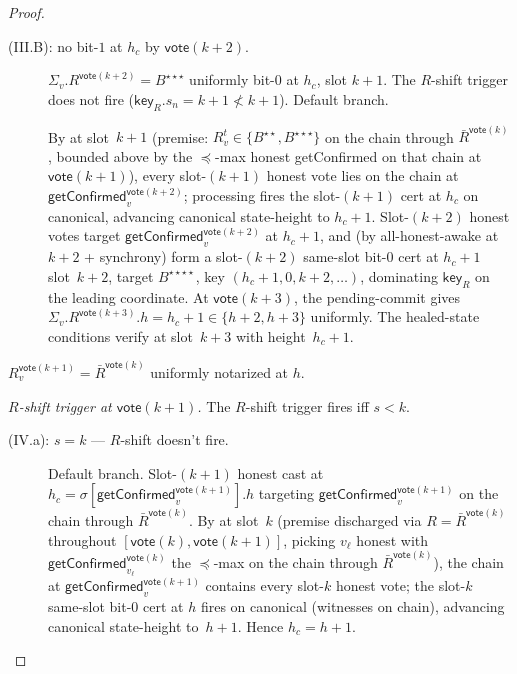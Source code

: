 \documentclass{article}
\newcommand{\key}{\mathsf{key}}
\newcommand{\vote}{\mathsf{vote}}
\newcommand{\comm}[1]{\bar{#1}}
\newcommand{\getConfirmed}{\textsf{getConfirmed}\xspace}
\theoremstyle{plain}
\theoremstyle{definition}
\theoremstyle{remark}
\newcommand{\AHA}{all-honest-awake\xspace}
\begin{document}
\begin{proof}
\begin{description}
\begin{description}
\item[{(III.B): no bit-$1$ at $h_c$ by $\vote(k+2)$.}]\hfill

$\Sigma_v.R^{\vote(k+2)} = B^{\star\star\star}$ uniformly bit-$0$ at $h_c$, slot $k+1$. The $R$-shift trigger does not fire ($\key_R.s_n = k+1 \not< k+1$). Default branch.

By  at slot~$k+1$ (premise: $R_v^t \in \{B^{\star\star}, B^{\star\star\star}\}$ on the chain through $\comm{R}^{\vote(k)}$, bounded above by the $\preceq$-max honest \getConfirmed{} on that chain at $\vote(k+1)$), every slot-$(k+1)$ honest vote lies on the chain at $\getConfirmed_v^{\vote(k+2)}$; processing fires the slot-$(k+1)$ cert at $h_c$ on canonical, advancing canonical state-height to $h_c + 1$. Slot-$(k+2)$ honest votes target $\getConfirmed_v^{\vote(k+2)}$ at $h_c + 1$, and (by \AHA at $k+2$ + synchrony) form a slot-$(k+2)$ same-slot bit-$0$ cert at $h_c + 1$ slot~$k+2$, target $B^{\star\star\star\star}$, key $(h_c+1, 0, k+2, \ldots)$, dominating $\key_R$ on the leading coordinate. At $\vote(k+3)$, the pending-commit gives $\Sigma_v.R^{\vote(k+3)}.h = h_c + 1 \in \{h+2, h+3\}$ uniformly. The healed-state conditions verify at slot~$k+3$ with height~$h_c + 1$.
\end{description}

\item[{Case (IV): $\key_R$ is $(h, 0, s, \comm{R}^{\vote(k)})$ with $s \in [s_v, k]$.}]\hfill

$R_v^{\vote(k+1)} = \comm{R}^{\vote(k)}$ uniformly notarized at $h$.

\emph{$R$-shift trigger at $\vote(k+1)$.}
The $R$-shift trigger fires iff $s < k$.

\begin{description}
\item[{(IV.a): $s = k$ — $R$-shift doesn't fire.}]\hfill

Default branch. Slot-$(k+1)$ honest cast at $h_c = \sigma[\getConfirmed_v^{\vote(k+1)}].h$ targeting $\getConfirmed_v^{\vote(k+1)}$ on the chain through $\comm{R}^{\vote(k)}$. By  at slot~$k$ (premise discharged via $R = \comm{R}^{\vote(k)}$ throughout $[\vote(k), \vote(k+1)]$, picking $v_\ell$ honest with $\getConfirmed_{v_\ell}^{\vote(k)}$ the $\preceq$-max on the chain through $\comm{R}^{\vote(k)}$), the chain at $\getConfirmed_v^{\vote(k+1)}$ contains every slot-$k$ honest vote; the slot-$k$ same-slot bit-$0$ cert at $h$ fires on canonical (witnesses on chain), advancing canonical state-height to~$h+1$. Hence $h_c = h+1$.


\end{description}
\end{description}
\end{proof}
\end{document}
